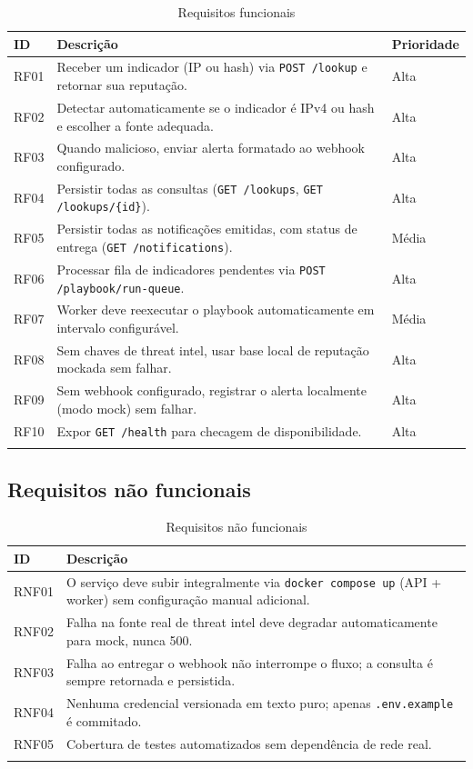 \documentclass[11pt,a4paper]{article}
\begin{document}
\begin{longtable}{p{1.4cm}p{10.5cm}p{1.6cm}}
\toprule
\textbf{ID} & \textbf{Descrição} & \textbf{Prioridade} \\
\midrule
\endhead
RF01 & Receber um indicador (IP ou hash) via \verb|POST /lookup| e retornar sua reputação. & Alta \\
RF02 & Detectar automaticamente se o indicador é IPv4 ou hash e escolher a fonte adequada. & Alta \\
RF03 & Quando malicioso, enviar alerta formatado ao webhook configurado. & Alta \\
RF04 & Persistir todas as consultas (\verb|GET /lookups|, \verb|GET /lookups/{id}|). & Alta \\
RF05 & Persistir todas as notificações emitidas, com status de entrega (\verb|GET /notifications|). & Média \\
RF06 & Processar fila de indicadores pendentes via \verb|POST /playbook/run-queue|. & Alta \\
RF07 & Worker deve reexecutar o playbook automaticamente em intervalo configurável. & Média \\
RF08 & Sem chaves de threat intel, usar base local de reputação mockada sem falhar. & Alta \\
RF09 & Sem webhook configurado, registrar o alerta localmente (modo mock) sem falhar. & Alta \\
RF10 & Expor \verb|GET /health| para checagem de disponibilidade. & Alta \\
\bottomrule
\caption{Requisitos funcionais}
\end{longtable}

\subsection{Requisitos não funcionais}

\begin{longtable}{p{1.6cm}p{12cm}}
\toprule
\textbf{ID} & \textbf{Descrição} \\
\midrule
\endhead
RNF01 & O serviço deve subir integralmente via \verb|docker compose up| (API + worker) sem configuração manual adicional. \\
RNF02 & Falha na fonte real de threat intel deve degradar automaticamente para mock, nunca 500. \\
RNF03 & Falha ao entregar o webhook não interrompe o fluxo; a consulta é sempre retornada e persistida. \\
RNF04 & Nenhuma credencial versionada em texto puro; apenas \verb|.env.example| é commitado. \\
RNF05 & Cobertura de testes automatizados sem dependência de rede real. \\
\bottomrule
\caption{Requisitos não funcionais}
\end{longtable}
\end{document}

